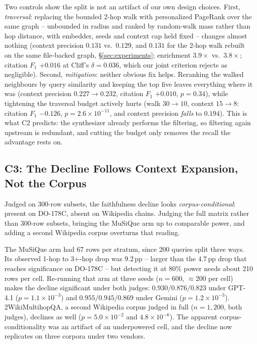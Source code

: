 Two controls show the split is not an artifact of our own design
choices. First, \emph{traversal}: replacing the bounded 2-hop walk with
personalized PageRank over the same graph -- unbounded in radius and
ranked by random-walk mass rather than hop distance, with embedder,
seeds and context cap held fixed -- changes almost nothing (context
precision $0.131$ vs.\ $0.129$, and $0.131$ for the 2-hop walk rebuilt
on the same file-backed graph, \S\ref{sec:experiments}; enrichment $3.9\times$ vs.\
$3.8\times$; citation $F_1$ $+0.016$ at Cliff's $\delta{=}0.036$, which
our joint criterion rejects as negligible). Second, \emph{mitigation}:
neither obvious fix helps. Reranking the walked neighbours by query
similarity and keeping the top five leaves everything where it was
(context precision $0.227{\to}0.232$, citation $F_1$ $+0.010$,
$p{=}0.34$), while tightening the traversal budget actively hurts
(walk $30{\to}10$, context $15{\to}8$: citation $F_1$ $-0.126$,
$p{=}2.6{\times}10^{-11}$, and context precision \emph{falls} to
$0.194$). This is what C2 predicts: the synthesizer already performs
the filtering, so filtering again upstream is redundant, and cutting
the budget only removes the recall the advantage rests on.

\subsection{C3: The Decline Follows Context Expansion, Not the Corpus}
\label{sec:c3}
Judged on 300-row subsets, the faithfulness decline looks
\emph{corpus-conditional}: present on DO-178C, absent on Wikipedia
chains. Judging the full matrix rather than 300-row subsets, bringing
the MuSiQue arm up to comparable power, and adding a second Wikipedia
corpus overturns that reading.

The MuSiQue arm had 67 rows per stratum, since 200 queries split three
ways. Its observed 1-hop to 3+-hop drop was $9.2$\,pp -- larger than the
$4.7$\,pp drop that reaches significance on DO-178C -- but detecting it
at 80\% power needs about 210 rows per cell. Re-running that arm at
three seeds ($n{=}600$, $\approx$200 per cell) makes the decline
significant under both judges: $0.930/0.876/0.823$ under GPT-4.1
($p{=}1.1{\times}10^{-3}$) and $0.955/0.945/0.869$ under Gemini
($p{=}1.2{\times}10^{-3}$). 2WikiMultihopQA, a second Wikipedia corpus
judged in full ($n{=}1{,}200$, both judges), declines as well
($p{=}5.0{\times}10^{-2}$ and $4.8{\times}10^{-6}$). The apparent
corpus-conditionality was an artifact of an underpowered cell, and the
decline now replicates on three corpora under two vendors.

